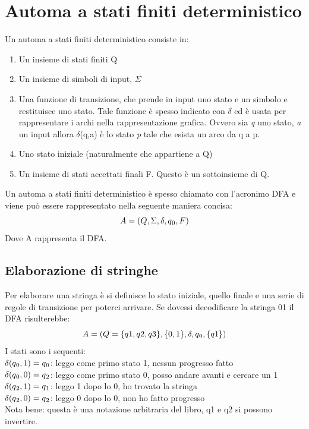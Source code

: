 \documentclass[12pt]{article}
\begin{document}
\section{Automa a stati finiti deterministico}
Un automa a stati finiti deterministico consiste in:
\begin{enumerate}
	\item Un insieme di stati finiti Q
	\item Un insieme di simboli di input, $\Sigma$
	\item Una funzione di transizione, che prende in input uno stato e un simbolo e restituisce uno stato. Tale funzione è spesso indicato con $\delta$ ed è usata per rappresentare i archi nella rappresentazione grafica. Ovvero sia \emph{q} uno stato, \emph{a} un input allora $\delta$(q,a) è lo stato \emph{p} tale che esista un arco da q a p.
	\item Uno stato iniziale (naturalmente che appartiene a Q)
	\item Un insieme di stati accettati finali F. Questo è un sottoinsieme di Q.
\end{enumerate}
Un automa a stati finiti deterministico è spesso chiamato con l'acronimo DFA e viene può essere rappresentato nella seguente maniera concisa:
\[A = (Q, \Sigma, \delta, q\textsubscript{0}, F)\]
Dove A rappresenta il DFA.

\subsection{ Elaborazione di stringhe }
Per elaborare una stringa è si definisce lo stato iniziale, quello finale e una serie di regole di transizione per poterci arrivare.
Se dovessi decodificare la stringa 01 il DFA risulterebbe:
\[A = (Q=\{q1,q2,q3\}, \{0,1\}, \delta, q\textsubscript{0}, \{q1\})\]
I stati sono i sequenti:
\\ $\delta(q\textsubscript{0},1)=q\textsubscript{0}$: leggo come primo stato 1, nessun progresso fatto
\\ $\delta(q\textsubscript{0},0)=q\textsubscript{2}$: leggo come primo stato 0, posso andare avanti e cercare un 1
\\ $\delta(q\textsubscript{2},1)=q\textsubscript{1}$: leggo 1 dopo lo 0, ho trovato la stringa
\\ $\delta(q\textsubscript{2},0)=q\textsubscript{2}$: leggo 0 dopo lo 0, non ho fatto progresso
\\ Nota bene: questa è una notazione arbitraria del libro, q1 e q2 si possono invertire.
\end{document}
